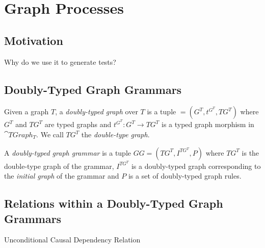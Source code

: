 \chapter{Graph Processes}

\section{Motivation}

Why do we use it to generate tests?

\section{Doubly-Typed Graph Grammars}

\begin{definition}Given a graph $T$, a \emph{doubly-typed graph} \doublyTypedGraph{} over $T$ is a tuple \doublyTypedGraph $= \left(G^T, t^{G^T},TG^T\right)$ where $G^T$ and $TG^T$ are typed graphs and \mbox{$t^{G^T} : G^T \rightarrow TG^T$} is a typed graph morphism in $\cat{TGraph_T}$. We call $TG^T$ the \emph{double-type graph}.
\end{definition}

\begin{definition}
\end{definition}

\begin{definition} A \emph{doubly-typed graph grammar} is a tuple $GG = \left( TG^T, I^{TG^T},P \right)$ where $TG^T$ is the double-type graph of the grammar, $I^{TG^T}$ is a doubly-typed graph corresponding to the \emph{initial graph} of the grammar and $P$ is a set of doubly-typed graph rules. 
\end{definition}

\begin{definition}
\end{definition}

\section{Relations within a Doubly-Typed Graph Grammars}

\begin{definition}{Unconditional Causal Dependency Relation}
\end{definition}

